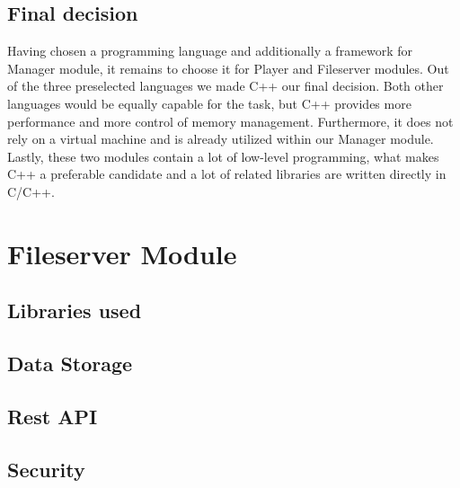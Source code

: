 \subsection{Final decision}

Having chosen a programming language and additionally a framework for Manager module, it remains to choose it for Player and Fileserver modules. Out of the three preselected languages we made C++ our final decision.
Both other languages would be equally capable for the task, but C++ provides more performance and more control of memory management. Furthermore, it does not rely on a virtual machine and is already utilized within our Manager module. Lastly, these two modules contain a lot of low-level programming, what makes C++ a preferable candidate and a lot of related libraries are written directly in C/C++.

\section{Fileserver Module}

\subsection{Libraries used}

\subsection{Data Storage}

\subsection{Rest API}

\subsection{Security}

